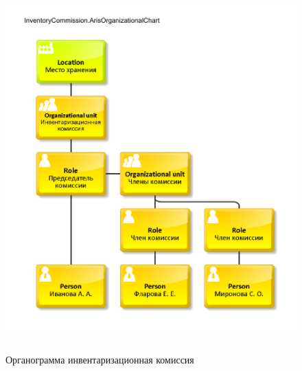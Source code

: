 \begin{figure}[!h]
    \centering
    \includegraphics[height=14cm]
    {assets/ARIS/OrganizationalChart/InventoryCommission.ArisOrganizationalChart.pdf}
    \caption{Органограмма инвентаризационная комиссия}
    \label{fig:ArisOrganizationalChart_InventoryCommission}
\end{figure}


